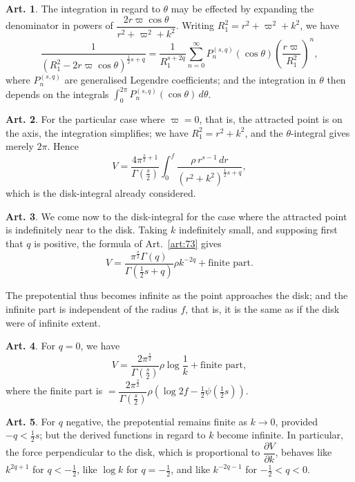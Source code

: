 \documentclass[12pt,a4paper]{article}
\theoremstyle{definition}
\newtheorem{art}{Art.}[section]
\begin{document}
\begin{art}\label{art:75}
The integration in regard to $\theta$ may be effected by expanding the denominator in powers of $\dfrac{2r\varpi\cos\theta}{r^2 + \varpi^2 + k^2}$. Writing $R_1^2 = r^2 + \varpi^2 + k^2$, we have
\[
\frac{1}{(R_1^2 - 2r\varpi\cos\theta)^{\frac{1}{2}s+q}} = \frac{1}{R_1^{s+2q}} \sum_{n=0}^\infty P_n^{(s,q)}(\cos\theta) \left(\frac{r\varpi}{R_1^2}\right)^n,
\]
where $P_n^{(s,q)}$ are generalised Legendre coefficients; and the integration in $\theta$ then depends on the integrals $\int_0^{2\pi} P_n^{(s,q)}(\cos\theta) \, d\theta$.
\end{art}

\begin{art}\label{art:76}
For the particular case where $\varpi = 0$, that is, the attracted point is on the axis, the integration simplifies; we have $R_1^2 = r^2 + k^2$, and the $\theta$-integral gives merely $2\pi$. Hence
\[
V = \frac{4\pi^{\frac{s}{2}+1}}{\Gamma(\frac{s}{2})} \int_0^f \frac{\rho \, r^{s-1} \, dr}{(r^2 + k^2)^{\frac{1}{2}s+q}},
\]
which is the disk-integral already considered.
\end{art}

\begin{art}\label{art:77}
We come now to the disk-integral for the case where the attracted point is indefinitely near to the disk. Taking $k$ indefinitely small, and supposing first that $q$ is positive, the formula of Art.~\ref{art:73} gives
\[
V = \frac{\pi^{\frac{s}{2}}\Gamma(q)}{\Gamma(\frac{1}{2}s+q)} \rho k^{-2q} + \text{finite part}.
\]

The prepotential thus becomes infinite as the point approaches the disk; and the infinite part is independent of the radius $f$, that is, it is the same as if the disk were of infinite extent.
\end{art}

\begin{art}\label{art:78}
For $q = 0$, we have
\[
V = \frac{2\pi^{\frac{s}{2}}}{\Gamma(\frac{s}{2})} \rho \log\frac{1}{k} + \text{finite part},
\]
where the finite part is $= \dfrac{2\pi^{\frac{s}{2}}}{\Gamma(\frac{s}{2})} \rho \left(\log 2f - \tfrac{1}{2}\psi(\tfrac{1}{2}s)\right)$.
\end{art}

\begin{art}\label{art:79}
For $q$ negative, the prepotential remains finite as $k \to 0$, provided $-q < \tfrac{1}{2}s$; but the derived functions in regard to $k$ become infinite. In particular, the force perpendicular to the disk, which is proportional to $\dfrac{\partial V}{\partial k}$, behaves like $k^{2q+1}$ for $q < -\tfrac{1}{2}$, like $\log k$ for $q = -\tfrac{1}{2}$, and like $k^{-2q-1}$ for $-\tfrac{1}{2} < q < 0$.
\end{art}
\end{document}
